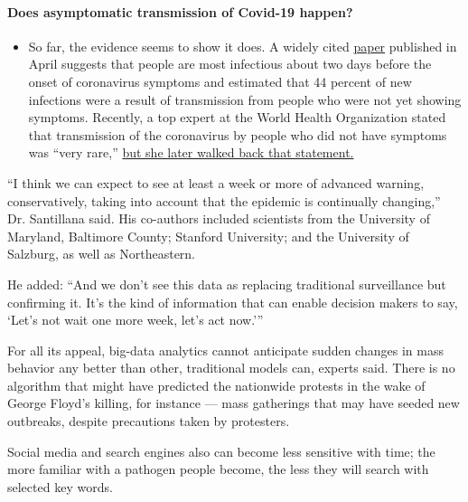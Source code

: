 \begin{itemize}
{  \paragraph{Does asymptomatic transmission of Covid-19
  happen?}\label{does-asymptomatic-transmission-of-covid-19-happen}}

  \begin{itemize}
  \tightlist
  \item
    So far, the evidence seems to show it does. A widely cited
    \href{https://www.nature.com/articles/s41591-020-0869-5}{paper}
    published in April suggests that people are most infectious about
    two days before the onset of coronavirus symptoms and estimated that
    44 percent of new infections were a result of transmission from
    people who were not yet showing symptoms. Recently, a top expert at
    the World Health Organization stated that transmission of the
    coronavirus by people who did not have symptoms was ``very rare,''
    \href{https://www.nytimes.com/2020/06/09/world/coronavirus-updates.html?action=click\&pgtype=Article\&state=default\&region=MAIN_CONTENT_3\&context=storylines_faq\#link-1f302e21}{but
    she later walked back that statement.}
  \end{itemize}
\end{itemize}

``I think we can expect to see at least a week or more of advanced
warning, conservatively, taking into account that the epidemic is
continually changing,'' Dr. Santillana said. His co-authors included
scientists from the University of Maryland, Baltimore County; Stanford
University; and the University of Salzburg, as well as Northeastern.

He added: ``And we don't see this data as replacing traditional
surveillance but confirming it. It's the kind of information that can
enable decision makers to say, `Let's not wait one more week, let's act
now.'''

For all its appeal, big-data analytics cannot anticipate sudden changes
in mass behavior any better than other, traditional models can, experts
said. There is no algorithm that might have predicted the nationwide
protests in the wake of George Floyd's killing, for instance --- mass
gatherings that may have seeded new outbreaks, despite precautions taken
by protesters.

Social media and search engines also can become less sensitive with
time; the more familiar with a pathogen people become, the less they
will search with selected key words.

